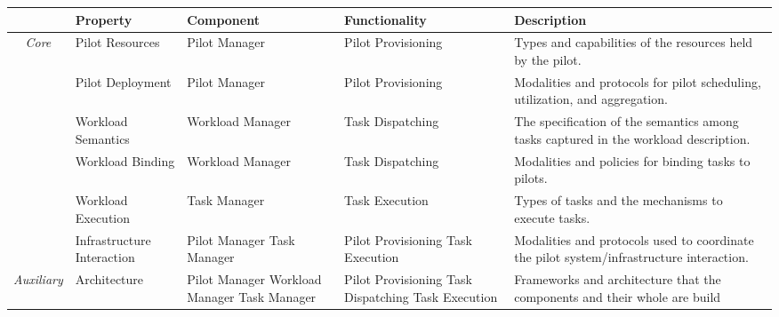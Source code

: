 \documentclass{sig-alternate}
\begin{document}
\begin{table}
\centering
\begin{tabular}{c|p{3.6cm}|p{2.7cm}|p{2.7cm}|p{5cm}|}
\cline{2-5}
                       &
\textbf{Property}      &
\textbf{Component}     &
\textbf{Functionality} &
\textbf{Description} \\
\hline
\multirow{6}{*}{\textit{Core}}  &
Pilot Resources                 &
Pilot Manager                   &
Pilot Provisioning              &
Types and capabilities of the resources held by the pilot. \\
\cline{2-5}
                                &
Pilot Deployment                &
Pilot Manager                   &
Pilot Provisioning              &
Modalities and protocols for pilot scheduling, utilization, and aggregation. \\
\cline{2-5}
                                &
Workload Semantics              &
Workload Manager                &
Task Dispatching                &
The specification of the semantics among tasks captured in the workload
description. \\
\cline{2-5}
                                &
Workload Binding                &
Workload Manager                &
Task Dispatching                &
Modalities and policies for binding tasks to pilots. \\
\cline{2-5}
                                &
Workload Execution              &
Task Manager                    &
Task Execution                  &
Types of tasks and the mechanisms to execute tasks. \\
\cline{2-5}
                                &
Infrastructure     \newline
  Interaction                   &
Pilot Manager      \newline
  Task Manager                  &
Pilot Provisioning \newline
  Task Execution                &
Modalities and protocols used to coordinate the pilot system/infrastructure
interaction. \\
\hline
\multirow{10}{*}{\textit{Auxiliary}} &
Architecture                         &
Pilot Manager      \newline
  Workload Manager \newline
  Task Manager                       &
Pilot Provisioning \newline
  Task Dispatching \newline
  Task Execution                     &
Frameworks and architecture that the components and their whole are build

\end{tabular}
\end{table}
\end{document}
